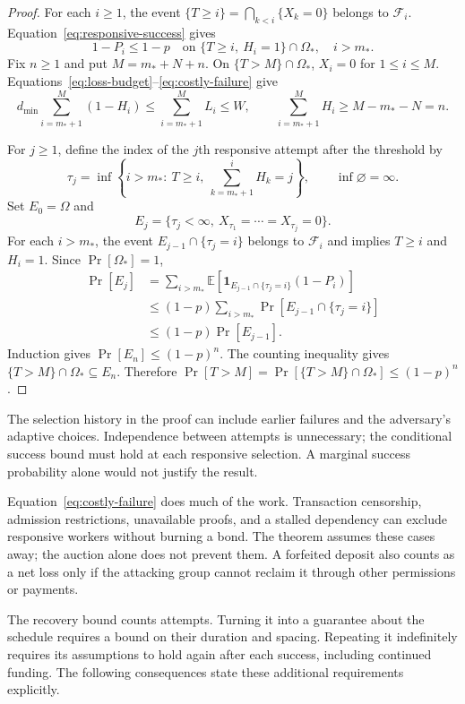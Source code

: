 \documentclass[10pt,letterpaper]{article}
\begin{document}
\begin{proof}
For each $i\geq1$, the event $\{T\geq i\}=\bigcap_{k<i}\{X_k=0\}$ belongs to $\mathcal F_i$. Equation~\eqref{eq:responsive-success} gives
\[
 1-P_i\leq1-p
 \quad\text{on }\{T\geq i,\ H_i=1\}\cap\Omega_*,\quad i>m_*.
\]
Fix $n\geq1$ and put $M=m_*+N+n$. On $\{T>M\}\cap\Omega_*$, $X_i=0$ for $1\leq i\leq M$. Equations~\eqref{eq:loss-budget}--\eqref{eq:costly-failure} give
\[
 d_{\min}\sum_{i=m_*+1}^{M}(1-H_i)\leq\sum_{i=m_*+1}^{M}L_i\leq W,
 \qquad
 \sum_{i=m_*+1}^{M}H_i\geq M-m_*-N=n.
\]

For $j\geq1$, define the index of the $j$th responsive attempt after the threshold by
\[
 \tau_j=\inf\left\{i>m_*:\ T\geq i,\
                    \sum_{k=m_*+1}^{i}H_k=j\right\},
 \qquad \inf\varnothing=\infty.
\]
Set $E_0=\Omega$ and
\[
 E_j=\{\tau_j<\infty,\ X_{\tau_1}=\cdots=X_{\tau_j}=0\}.
\]
For each $i>m_*$, the event $E_{j-1}\cap\{\tau_j=i\}$ belongs to $\mathcal F_i$ and implies $T\geq i$ and $H_i=1$. Since $\Pr[\Omega_*]=1$,
\begin{align*}
 \Pr[E_j]
 &=\sum_{i>m_*}\mathbb E\!\left[
       \mathbf 1_{E_{j-1}\cap\{\tau_j=i\}}
       (1-P_i)\right]\\
 &\leq(1-p)\sum_{i>m_*}\Pr[E_{j-1}\cap\{\tau_j=i\}]\\
 &\leq(1-p)\Pr[E_{j-1}].
\end{align*}
Induction gives $\Pr[E_n]\leq(1-p)^n$. The counting inequality gives $\{T>M\}\cap\Omega_*\subseteq E_n$. Therefore $\Pr[T>M]=\Pr[\{T>M\}\cap\Omega_*]\leq(1-p)^n$.
\end{proof}

The selection history in the proof can include earlier failures and the adversary's adaptive choices. Independence between attempts is unnecessary; the conditional success bound must hold at each responsive selection. A marginal success probability alone would not justify the result.

Equation~\eqref{eq:costly-failure} does much of the work. Transaction censorship, admission restrictions, unavailable proofs, and a stalled dependency can exclude responsive workers without burning a bond. The theorem assumes these cases away; the auction alone does not prevent them. A forfeited deposit also counts as a net loss only if the attacking group cannot reclaim it through other permissions or payments.

The recovery bound counts attempts. Turning it into a guarantee about the schedule requires a bound on their duration and spacing. Repeating it indefinitely requires its assumptions to hold again after each success, including continued funding. The following consequences state these additional requirements explicitly.
\end{document}
